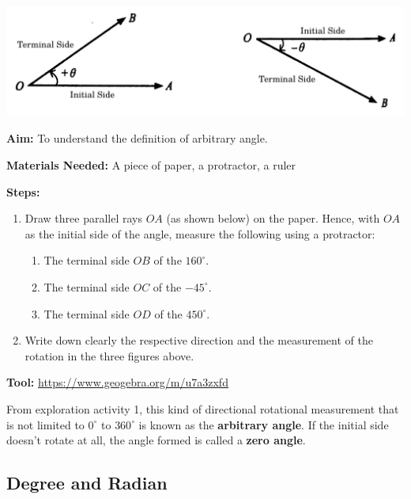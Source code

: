 \documentclass{report}
\begin{document}
\begin{center}
    \includegraphics[scale=0.23]{assets/8-2.png}
\end{center}

\begin{explore}
    
    \textbf{Aim:} To understand the definition of arbitrary angle.

    \textbf{Materials Needed:} A piece of paper, a protractor, a ruler

    \textbf{Steps:}
    \vspace{-1em}
    \begin{enumerate}
        \item Draw three parallel rays $OA$ (as shown below) on the paper. Hence, with $OA$ as the initial side of the angle, measure the following using a protractor:
        \begin{enumerate}
            \item The terminal side $OB$ of the $160^\circ$.
            \item The terminal side $OC$ of the $-45^\circ$.
            \item The terminal side $OD$ of the $450^\circ$.
        \end{enumerate}
        \item Write down clearly the respective direction and the measurement of the rotation in the three figures above.
    \end{enumerate}

    \textbf{Tool:} \underline{\url{https://www.geogebra.org/m/u7a3zxfd}}
\end{explore}

From exploration activity 1, this kind of directional rotational measurement that is not limited to $0^\circ$ to $360^\circ$ is known as the \textbf{arbitrary angle}. If the initial side doesn't rotate at all, the angle formed is called a \textbf{zero angle}.

\subsection*{Degree and Radian}
\end{document}
